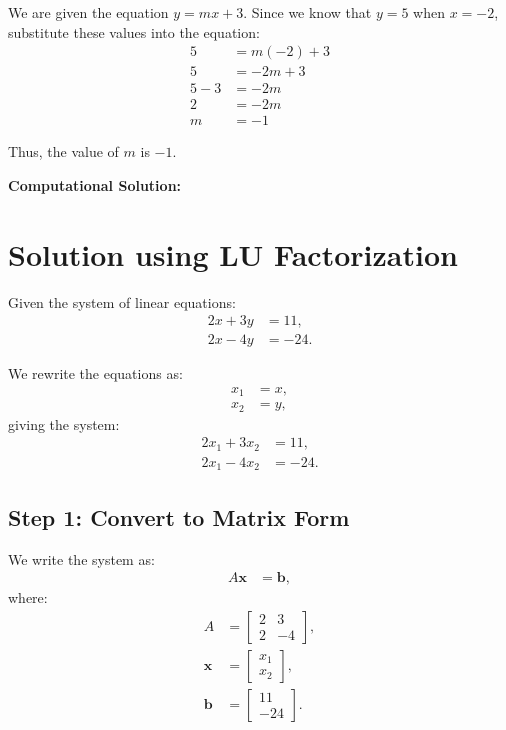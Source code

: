\documentclass[journal]{IEEEtran}
\begin{document}
We are given the equation \( y = mx + 3 \). Since we know that \( y = 5 \) when \( x = -2 \), substitute these values into the equation:
\begin{align}
5 &= m(-2) + 3 \\
5 &= -2m + 3 \\
5 - 3 &= -2m \\
2 &= -2m \\
m &= -1
\end{align}

Thus, the value of \( m \) is \( \boxed{-1} \).

	\textbf{Computational Solution:}
	\newline
\section*{Solution using LU Factorization}

Given the system of linear equations:
\begin{align}
2x + 3y &= 11, \label{eq1} \\
2x - 4y &= -24. \label{eq2}
\end{align}

We rewrite the equations as:
\begin{align}
x_1 &= x, \\
x_2 &= y,
\end{align}
giving the system:
\begin{align}
2x_1 + 3x_2 &= 11, \label{eq3} \\
2x_1 - 4x_2 &= -24. \label{eq4}
\end{align}

\subsection*{Step 1: Convert to Matrix Form}
We write the system as:
\begin{align}
A \mathbf{x} &= \mathbf{b},
\end{align}
where:
\begin{align}
A &= \begin{bmatrix} 2 & 3 \\ 2 & -4 \end{bmatrix}, \\
\mathbf{x} &= \begin{bmatrix} x_1 \\ x_2 \end{bmatrix}, \\
\mathbf{b} &= \begin{bmatrix} 11 \\ -24 \end{bmatrix}.
\end{align}
\end{document}
